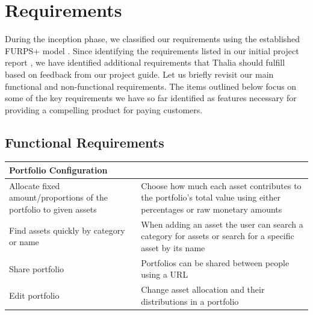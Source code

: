 \documentclass[main.tex]{subfiles}
\begin{document}
\section{Requirements}
During the inception phase, we classified our requirements using the established FURPS+ model \cite{FURPS}. Since identifying the requirements listed in our initial project report \cite{TR}, we have identified additional requirements that Thalia should fulfill based on feedback from our project guide. Let us briefly revisit our main functional and non-functional requirements. The items outlined below focus on some of the key requirements we have so far identified as features necessary for providing a compelling product for paying customers.

\subsection{Functional Requirements}
 
{
\setlength{\tabcolsep}{30pt}
\renewcommand{\arraystretch}{2}
\centering
{}
\begin{tabularx}{\linewidth}{|X|X|}
\hline
 \textbf{Portfolio Configuration}  &  \\
 \hline
 Allocate fixed amount/proportions of the portfolio to given assets & Choose how much each asset contributes to the portfolio's total value using either percentages or raw monetary amounts \\
\hline
Find assets quickly by category or name & When adding an asset the user can search a category for assets or search for a specific asset by its name \\
\hline
Share portfolio & Portfolios can be shared between people using a URL \\
\hline
Edit portfolio & Change asset allocation and their distributions in a portfolio \\
\hline
\end{tabularx}
}
\end{document}
